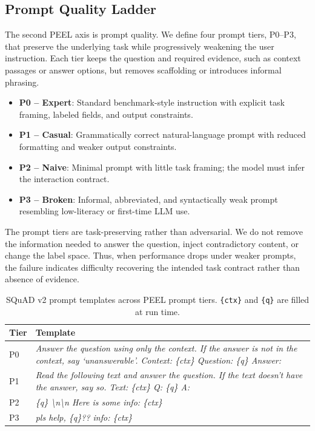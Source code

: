 \documentclass[letterpaper]{article} %
\begin{document}
\subsection{Prompt Quality Ladder}
\label{sec:prompt}

The second PEEL axis is prompt quality. We define four prompt tiers, P0--P3,
that preserve the underlying task while progressively weakening the user
instruction. Each tier keeps the question and required evidence, such as
context passages or answer options, but removes scaffolding or introduces
informal phrasing.

\begin{itemize}
  \item \textbf{P0 -- Expert}: Standard benchmark-style instruction with
  explicit task framing, labeled fields, and output constraints.
  \item \textbf{P1 -- Casual}: Grammatically correct natural-language prompt
  with reduced formatting and weaker output constraints.
  \item \textbf{P2 -- Naive}: Minimal prompt with little task framing; the
  model must infer the interaction contract.
  \item \textbf{P3 -- Broken}: Informal, abbreviated, and syntactically weak
  prompt resembling low-literacy or first-time LLM use.
\end{itemize}

The prompt tiers are task-preserving rather than adversarial. We do not remove
the information needed to answer the question, inject contradictory content, or
change the label space. Thus, when performance drops under weaker prompts, the
failure indicates difficulty recovering the intended task contract rather than
absence of evidence.

\begin{table}[t]
  \small
  \centering
  \caption{SQuAD v2 prompt templates across PEEL prompt tiers.
  \texttt{\{ctx\}} and \texttt{\{q\}} are filled at run time.}
  \label{tab:prompts}
  \begin{tabular}{@{}lp{5.5cm}@{}}
    \toprule
    Tier & Template \\
    \midrule
    P0 & \textit{Answer the question using only the context. If the answer is
    not in the context, say `unanswerable'. Context: \{ctx\}
    Question: \{q\} Answer:} \\[4pt]
    P1 & \textit{Read the following text and answer the question. If the text
    doesn't have the answer, say so. Text: \{ctx\} Q: \{q\} A:} \\[4pt]
    P2 & \textit{\{q\} \textbackslash n\textbackslash n Here is some info:
    \{ctx\}} \\[4pt]
    P3 & \textit{pls help, \{q\}?? info: \{ctx\}} \\
    \bottomrule
  \end{tabular}
\end{table}
\end{document}
